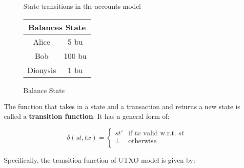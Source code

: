 \begin{figure}[h]
    \centering
    \caption{State transitions in the accounts model}
    \label{fig:AccountsModelDiagram}
\end{figure}

\begin{figure}[ht]
    \centering
        \begin{tabular}{c|c}
        \multicolumn{2}{c}{Balances State} \\
        \hline
        Alice   & 5 bu  \\
        \hline
        Bob     & 100 bu \\
        \hline
        Dionysis & 1 bu \\
        \hline
        \end{tabular}
    \caption{Balance State}
    \label{fig:balanceState}
\end{figure}

The function that takes in a state and a transaction and returns a new state is called a \textbf{transition function}. It has a general form of:

\begin{equation}
    \delta (st,tx) =
        \begin{cases}
        st' & \text{if $tx$ valid w.r.t. $st$} \\
        \perp & \text{otherwise} \\
        \end{cases}
\end{equation}

Specifically, the transition function of UTXO model is given by:

